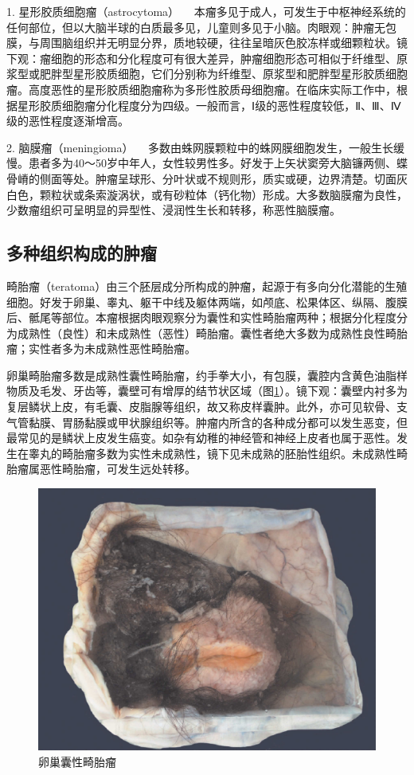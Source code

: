 {1. 星形胶质细胞瘤（astrocytoma）}
　本瘤多见于成人，可发生于中枢神经系统的任何部位，但以大脑半球的白质最多见，儿童则多见于小脑。肉眼观：肿瘤无包膜，与周围脑组织并无明显分界，质地较硬，往往呈暗灰色胶冻样或细颗粒状。镜下观：瘤细胞的形态和分化程度可有很大差异，肿瘤细胞形态可相似于纤维型、原浆型或肥胖型星形胶质细胞，它们分别称为纤维型、原浆型和肥胖型星形胶质细胞瘤。高度恶性的星形胶质细胞瘤称为多形性胶质母细胞瘤。在临床实际工作中，根据星形胶质细胞瘤分化程度分为四级。一般而言，Ⅰ级的恶性程度较低，Ⅱ、Ⅲ、Ⅳ级的恶性程度逐渐增高。

{2. 脑膜瘤（meningioma）}
　多数由蛛网膜颗粒中的蛛网膜细胞发生，一般生长缓慢。患者多为40～50岁中年人，女性较男性多。好发于上矢状窦旁大脑镰两侧、蝶骨嵴的侧面等处。肿瘤呈球形、分叶状或不规则形，质实或硬，边界清楚。切面灰白色，颗粒状或条索漩涡状，或有砂粒体（钙化物）形成。大多数脑膜瘤为良性，少数瘤组织可呈明显的异型性、浸润性生长和转移，称恶性脑膜瘤。

\subsection{多种组织构成的肿瘤}

畸胎瘤（teratoma）由三个胚层成分所构成的肿瘤，起源于有多向分化潜能的生殖细胞。好发于卵巢、睾丸、躯干中线及躯体两端，如颅底、松果体区、纵隔、腹膜后、骶尾等部位。本瘤根据肉眼观察分为囊性和实性畸胎瘤两种；根据分化程度分为成熟性（良性）和未成熟性（恶性）畸胎瘤。囊性者绝大多数为成熟性良性畸胎瘤；实性者多为未成熟性恶性畸胎瘤。

卵巢畸胎瘤多数是成熟性囊性畸胎瘤，约手拳大小，有包膜，囊腔内含黄色油脂样物质及毛发、牙齿等，囊壁可有增厚的结节状区域（图\ref{fig5-18}）。镜下观：囊壁内衬多为复层鳞状上皮，有毛囊、皮脂腺等组织，故又称皮样囊肿。此外，亦可见软骨、支气管黏膜、胃肠黏膜或甲状腺组织等。肿瘤内所含的各种成分都可以发生恶变，但最常见的是鳞状上皮发生癌变。如杂有幼稚的神经管和神经上皮者也属于恶性。发生在睾丸的畸胎瘤多数为实性未成熟性，镜下见未成熟的胚胎性组织。未成熟性畸胎瘤属恶性畸胎瘤，可发生远处转移。

\begin{figure}[!htbp]
 \centering
 \includegraphics{./images/Image00087.jpg}
 \caption{卵巢囊性畸胎瘤}
 \label{fig5-18}
  \end{figure}

